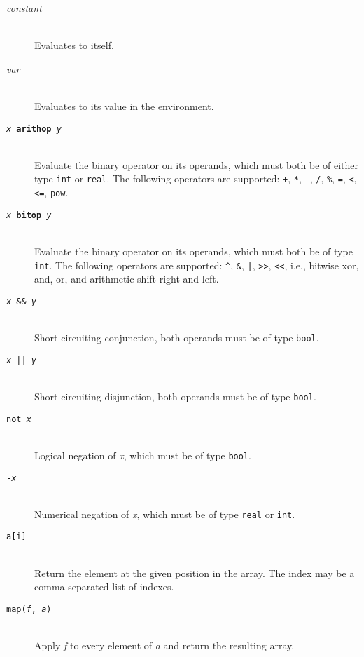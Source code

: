\documentclass[oneside]{memoir}
\newcommand\boolt[0]{\texttt{bool}}
\newcommand\realt[0]{\texttt{real}}
\newcommand\intt[0]{\texttt{int}}
\begin{document}
\begin{description}
  \item[\textit{constant}]\hfill\\
    Evaluates to itself.

  \item[\textit{var}]\hfill\\
    Evaluates to its value in the environment.

  \item[\texttt{\textit{x} \textbf{arithop} \textit{y}}] \hfill\\
    Evaluate the binary operator on its operands, which must both be
    of either type \intt{} or \realt.  The following operators are
    supported: \texttt{+}, \texttt{*}, \texttt{-}, \texttt{/},
    \texttt{\%}, \texttt{=}, \texttt{<}, \texttt{<=}, \texttt{pow}.

  \item[\texttt{\textit{x} \textbf{bitop} \textit{y}}] \hfill\\
    Evaluate the binary operator on its operands, which must both be
    of type \intt.  The following operators are supported:
    \texttt{\^}, \texttt{\&}, \texttt{|}, \texttt{>>}, \texttt{<<},
    i.e., bitwise xor, and, or, and arithmetic shift right and left.

  \item[\texttt{\textit{x} \&\& \textit{y}}]\hfill\\
    Short-circuiting conjunction, both operands must be of type \boolt.

  \item[\texttt{\textit{x} || \textit{y}}]\hfill\\
    Short-circuiting disjunction, both operands must be of type \boolt.

  \item[\texttt{not \textit{x}}]\hfill\\
    Logical negation of \textit{x}, which must be of type \boolt.

  \item[\texttt{-\textit{x}}]\hfill\\
    Numerical negation of \textit{x}, which must be of type \realt{} or \intt.

  \item[\texttt{a[i]}]\hfill\\
    Return the element at the given position in the array.  The index
    may be a comma-separated list of indexes.

  \item[\texttt{map(\textit{f}, \textit{a})}]\hfill\\
    Apply \textit{f} to every element of \textit{a} and return the resulting array.


\end{description}
\end{document}
